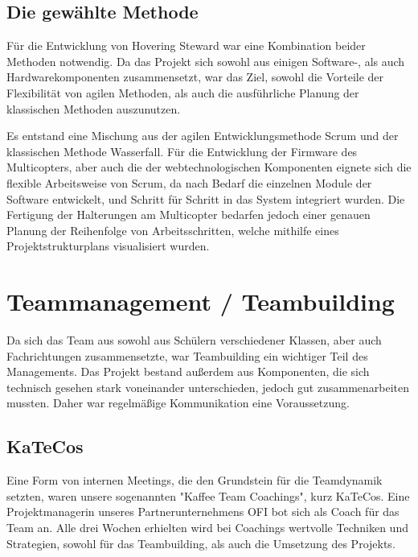 \subsection{Die gewählte Methode}
Für die Entwicklung von Hovering Steward war eine Kombination beider Methoden notwendig. Da
das Projekt sich sowohl aus einigen Software-, als auch Hardwarekomponenten zusammensetzt, war das
Ziel, sowohl die Vorteile der Flexibilität von agilen Methoden, als auch die ausführliche Planung der klassischen
Methoden auszunutzen.

Es entstand eine Mischung aus der agilen Entwicklungsmethode Scrum und der klassischen Methode Wasserfall.
Für die Entwicklung der Firmware des Multicopters, aber auch die der webtechnologischen Komponenten eignete
sich die flexible Arbeitsweise von Scrum, da nach Bedarf die einzelnen Module der Software entwickelt, und Schritt
für Schritt in das System integriert wurden.
Die Fertigung der Halterungen am Multicopter bedarfen jedoch einer genauen Planung der Reihenfolge von Arbeitsschritten,
welche mithilfe eines Projektstrukturplans visualisiert wurden.

\section{Teammanagement / Teambuilding}
Da sich das Team aus sowohl aus Schülern verschiedener Klassen, aber auch Fachrichtungen
zusammensetzte, war Teambuilding ein wichtiger Teil des Managements. Das Projekt bestand außerdem
aus Komponenten, die sich technisch gesehen stark voneinander unterschieden, jedoch gut zusammenarbeiten mussten.
Daher war regelmäßige Kommunikation eine Voraussetzung.

  \subsection{KaTeCos}
  Eine Form von internen Meetings, die den Grundstein für die Teamdynamik setzten, waren unsere
  sogenannten "Kaffee Team Coachings", kurz KaTeCos. Eine Projektmanagerin unseres Partnerunternehmens OFI
  bot sich als Coach für das Team an. Alle drei Wochen erhielten wird bei Coachings wertvolle Techniken und
  Strategien, sowohl für das Teambuilding, als auch die Umsetzung des Projekts.

